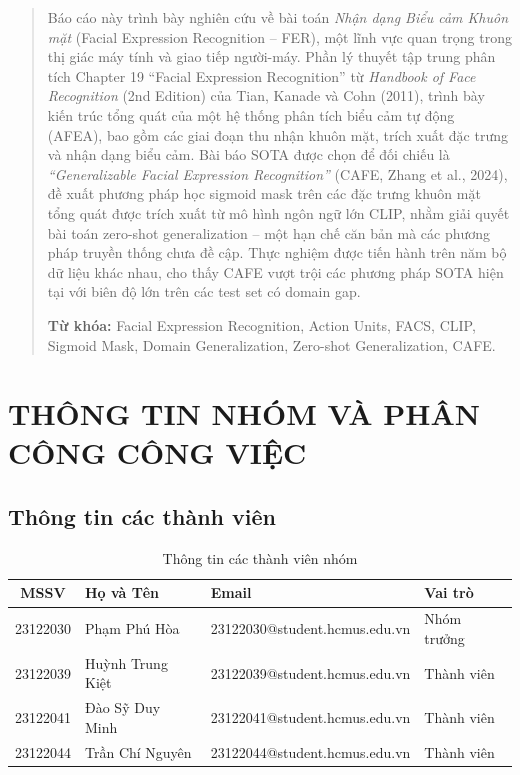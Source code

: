 \documentclass[12pt,a4paper]{article}
\let\oldtextbf\textbf
\renewcommand{\textbf}[1]{\oldtextbf{\textcolor{hcmublue}{#1}}}
\begin{document}
\begin{abstract}
Báo cáo này trình bày nghiên cứu về bài toán \textit{Nhận dạng Biểu cảm Khuôn mặt} (Facial Expression Recognition -- FER), một lĩnh vực quan trọng trong thị giác máy tính và giao tiếp người-máy. Phần lý thuyết tập trung phân tích Chapter 19 ``Facial Expression Recognition'' từ \textit{Handbook of Face Recognition} (2nd Edition) của Tian, Kanade và Cohn (2011), trình bày kiến trúc tổng quát của một hệ thống phân tích biểu cảm tự động (AFEA), bao gồm các giai đoạn thu nhận khuôn mặt, trích xuất đặc trưng và nhận dạng biểu cảm. Bài báo SOTA được chọn để đối chiếu là \textit{``Generalizable Facial Expression Recognition''} (CAFE, Zhang et al., 2024), đề xuất phương pháp học sigmoid mask trên các đặc trưng khuôn mặt tổng quát được trích xuất từ mô hình ngôn ngữ lớn CLIP, nhằm giải quyết bài toán zero-shot generalization -- một hạn chế căn bản mà các phương pháp truyền thống chưa đề cập. Thực nghiệm được tiến hành trên năm bộ dữ liệu khác nhau, cho thấy CAFE vượt trội các phương pháp SOTA hiện tại với biên độ lớn trên các test set có domain gap.

\textbf{Từ khóa:} Facial Expression Recognition, Action Units, FACS, CLIP, Sigmoid Mask, Domain Generalization, Zero-shot Generalization, CAFE.
\end{abstract}

\newpage
\tableofcontents
\newpage
\listoftables
\listoffigures
\newpage
\printglossary[title={Danh sách Thuật ngữ}, toctitle={Danh sách Thuật ngữ}]
\printglossary[type=\acronymtype, title={Danh sách Viết tắt}]
\newpage

\section{THÔNG TIN NHÓM VÀ PHÂN CÔNG CÔNG VIỆC}

\subsection{Thông tin các thành viên}

\begin{table}[H]
\centering
\begin{tabular}{|c|l|l|l|}
\hline
\textbf{MSSV} & \textbf{Họ và Tên} & \textbf{Email} & \textbf{Vai trò} \\ \hline
23122030 & Phạm Phú Hòa    & 23122030@student.hcmus.edu.vn & Nhóm trưởng \\ \hline
23122039 & Huỳnh Trung Kiệt & 23122039@student.hcmus.edu.vn & Thành viên \\ \hline
23122041 & Đào Sỹ Duy Minh  & 23122041@student.hcmus.edu.vn & Thành viên \\ \hline
23122044 & Trần Chí Nguyên  & 23122044@student.hcmus.edu.vn & Thành viên \\ \hline
\end{tabular}
\caption{Thông tin các thành viên nhóm}
\label{tab:team_info}
\end{table}
\end{document}
